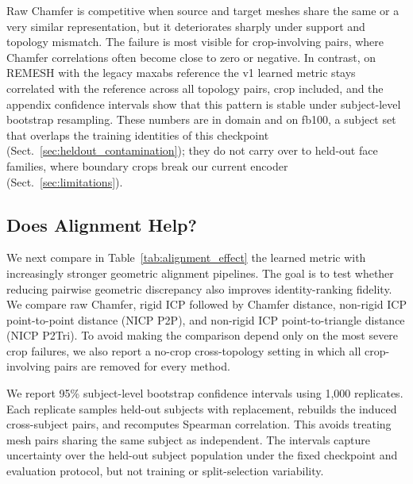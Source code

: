 \documentclass[10pt,twocolumn,letterpaper]{article}
\begin{document}
Raw Chamfer is competitive when source and target meshes share the same or a very similar representation, but it deteriorates sharply under support and topology mismatch. The failure is most visible for crop-involving pairs, where Chamfer correlations often become close to zero or negative. In contrast, on REMESH with the legacy maxabs reference the v1 learned metric stays correlated with the reference across all topology pairs, crop included, and the appendix confidence intervals show that this pattern is stable under subject-level bootstrap resampling. These numbers are in domain and on fb100, a subject set that overlaps the training identities of this checkpoint (Sect.~\ref{sec:heldout_contamination}); they do not carry over to held-out face families, where boundary crops break our current encoder (Sect.~\ref{sec:limitations}).

\subsection{Does Alignment Help?}
\label{sec:alignment_results}

We next compare in Table~\ref{tab:alignment_effect} the learned metric with increasingly stronger geometric alignment pipelines. The goal is to test whether reducing pairwise geometric discrepancy also improves identity-ranking fidelity. We compare raw Chamfer, rigid ICP followed by Chamfer distance, non-rigid ICP point-to-point distance (NICP P2P), and non-rigid ICP point-to-triangle distance (NICP P2Tri). To avoid making the comparison depend only on the most severe crop failures, we also report a no-crop cross-topology setting in which all crop-involving pairs are removed for every method.

We report 95\% subject-level bootstrap confidence intervals using 1,000
replicates. Each replicate samples held-out subjects with replacement, rebuilds
the induced cross-subject pairs, and recomputes Spearman correlation. This avoids
treating mesh pairs sharing the same subject as independent. The intervals
capture uncertainty over the held-out subject population under the fixed
checkpoint and evaluation protocol, but not training or split-selection
variability.
\end{document}
